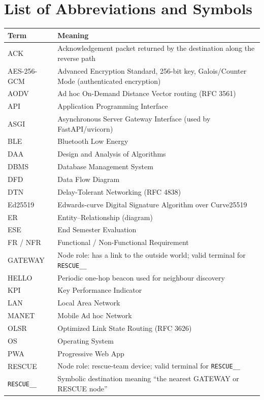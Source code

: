 \section*{List of Abbreviations and Symbols}
\footnotesize
\renewcommand{\arraystretch}{1.0}
\begin{longtable}{L{3.2cm}L{12.4cm}}
\toprule
\textbf{Term} & \textbf{Meaning}\\ \midrule \endhead
ACK & Acknowledgement packet returned by the destination along the reverse path\\
AES-256-GCM & Advanced Encryption Standard, 256-bit key, Galois/Counter Mode (authenticated encryption)\\
AODV & Ad hoc On-Demand Distance Vector routing (RFC 3561)\\
API & Application Programming Interface\\
ASGI & Asynchronous Server Gateway Interface (used by FastAPI/uvicorn)\\
BLE & Bluetooth Low Energy\\
DAA & Design and Analysis of Algorithms\\
DBMS & Database Management System\\
DFD & Data Flow Diagram\\
DTN & Delay-Tolerant Networking (RFC 4838)\\
Ed25519 & Edwards-curve Digital Signature Algorithm over Curve25519\\
ER & Entity--Relationship (diagram)\\
ESE & End Semester Evaluation\\
FR / NFR & Functional / Non-Functional Requirement\\
GATEWAY & Node role: has a link to the outside world; valid terminal for \texttt{RESCUE\_\_}\\
HELLO & Periodic one-hop beacon used for neighbour discovery\\
KPI & Key Performance Indicator\\
LAN & Local Area Network\\
MANET & Mobile Ad hoc Network\\
OLSR & Optimized Link State Routing (RFC 3626)\\
OS & Operating System\\
PWA & Progressive Web App\\
RESCUE & Node role: rescue-team device; valid terminal for \texttt{RESCUE\_\_}\\
\texttt{RESCUE\_\_} & Symbolic destination meaning ``the nearest GATEWAY or RESCUE node''\\

\end{longtable}
